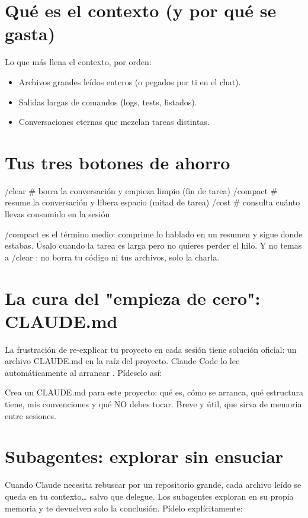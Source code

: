 \documentclass[11pt,a4paper]{book}
\begin{document}
\section{Qué es el contexto (y por qué se gasta)}
Lo que más llena el contexto, por orden:

\begin{itemize}\item Archivos grandes leídos enteros (o pegados por ti en el chat).\end{itemize}
\begin{itemize}\item Salidas largas de comandos (logs, tests, listados).\end{itemize}
\begin{itemize}\item Conversaciones eternas que mezclan tareas distintas.\end{itemize}
\section{Tus tres botones de ahorro}
\begin{codebox}
/clear    # borra la conversación y empieza limpio (fin de tarea)
/compact  # resume la conversación y libera espacio (mitad de tarea)
/cost     # consulta cuánto llevas consumido en la sesión
\end{codebox}
/compact es el término medio: comprime lo hablado en un resumen y sigue donde estabas. Úsalo cuando la tarea es larga pero no quieres perder el hilo. Y no temas a /clear : no borra tu código ni tus archivos, solo la charla.

\section{La cura del "empieza de cero": CLAUDE.md}
La frustración de re-explicar tu proyecto en cada sesión tiene solución oficial: un archivo CLAUDE.md en la raíz del proyecto. Claude Code lo lee automáticamente al arrancar . Pídeselo así:

\begin{codebox}
Crea un CLAUDE.md para este proyecto: qué es, cómo se arranca,
qué estructura tiene, mis convenciones y qué NO debes tocar.
Breve y útil, que sirva de memoria entre sesiones.
\end{codebox}
\section{Subagentes: explorar sin ensuciar}
Cuando Claude necesita rebuscar por un repositorio grande, cada archivo leído se queda en tu contexto… salvo que delegue. Los subagentes exploran en su propia memoria y te devuelven solo la conclusión. Pídelo explícitamente:
\end{document}
